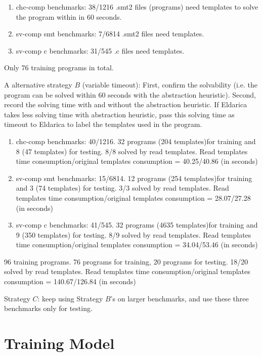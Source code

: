\documentclass{article}
\begin{document}
\begin{enumerate}
  \item chc-comp benchmarks: 38/1216 .smt2 files (programs) need templates to solve the program within in 60 seconds.
  \item sv-comp smt benchmarks: 7/6814 .smt2 files need templates.
  \item sv-comp c benchmarks: 31/545 .c files need templates.
\end{enumerate}

Only 76 training programs in total.

A alternative strategy $B$ (variable timeout): First, confirm the solvability (i.e. the program can be solved within 60 seconds with the abstraction heuristic).
Second, record the solving time with and without the abstraction heuristic. If Eldarica takes less solving time with abstraction heuristic, pass this solving time as timeout to Eldarica to label the templates used in the program.

\begin{enumerate}
  \item chc-comp benchmarks: 40/1216.  32 programs (204 templates)for training and 8 (47 templates) for testing. 8/8 solved by read templates. Read templates time consumption/original templates consumption =  40.25/40.86 (in seconds)
  \item sv-comp smt benchmarks: 15/6814.  12 programs (254 templates)for training and 3 (74 templates) for testing. 3/3 solved by read templates. Read templates time consumption/original templates consumption =  28.07/27.28 (in seconds)
  \item sv-comp c benchmarks: 41/545.  32 programs (4635 templates)for training and 9 (350 templates) for testing. 8/9 solved by read templates. Read templates time consumption/original templates consumption = 34.04/53.46  (in seconds)
\end{enumerate}

96 training programs. 76 programs for training, 20 programs for testing.
18/20 solved by read templates. Read templates time consumption/original templates consumption =  140.67/126.84 (in seconds)

Strategy $C$: keep using Strategy $B$'s on larger benchmarks, and use these three benchmarks only for testing.



\section{Training Model}
\end{document}
